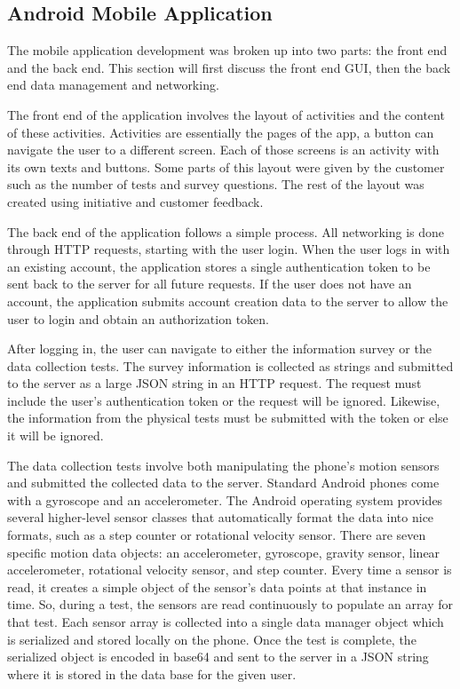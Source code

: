 \documentclass[conference]{IEEEtran}
\begin{document}
\subsection{Android Mobile Application}
The mobile application development was broken up into two parts: the front end and the back end. This section will first discuss the front end GUI, then the back end data management and networking.

The front end of the application involves the layout of activities and the content of these activities. Activities are essentially the pages of the app, a button can navigate the user to a different screen. Each of those screens is an activity with its own texts and buttons. Some parts of this layout were given by the customer such as the number of tests and survey questions. The rest of the layout was created using initiative and customer feedback.

The back end of the application follows a simple process. All networking is done through HTTP requests, starting with the user login. When the user logs in with an existing account, the application stores a single authentication token to be sent back to the server for all future requests. If the user does not have an account, the application submits account creation data to the server to allow the user to login and obtain an authorization token. 

After logging in, the user can navigate to either the information survey or the data collection tests. The survey information is collected as strings and submitted to the server as a large JSON string in an HTTP request. The request must include the user's authentication token or the request will be ignored. Likewise, the information from the physical tests must be submitted with the token or else it will be ignored.

The data collection tests involve both manipulating the phone's motion sensors and submitted the collected data to the server. Standard Android phones come with a gyroscope and an accelerometer. The Android operating system provides several higher-level sensor classes that automatically format the data into nice formats, such as a step counter or rotational velocity sensor. There are seven specific motion data objects: an accelerometer, gyroscope, gravity sensor, linear accelerometer, rotational velocity sensor, and step counter. Every time a sensor is read, it creates a simple object of the sensor's data points at that instance in time. So, during a test, the sensors are read continuously to populate an array for that test. Each sensor array is collected into a single data manager object which is serialized and stored locally on the phone. Once the test is complete, the serialized object is encoded in base64 and sent to the server in a JSON string where it is stored in the data base for the given user. 
\end{document}
